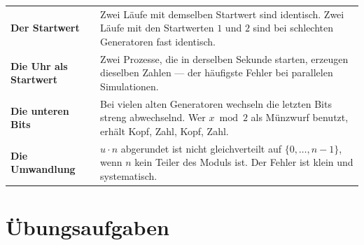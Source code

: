 \begin{warnung}
\begin{center}
{\small
\renewcommand{\arraystretch}{1.52}
\begin{tabular}{@{}P{2.8cm}P{5.8cm}@{}}
\toprule
\textbf{Der Startwert} & Zwei Läufe mit demselben Startwert sind identisch. Zwei Läufe mit den Startwerten $1$ und $2$ sind bei schlechten Generatoren fast identisch.\\
\textbf{Die Uhr als Startwert} & Zwei Prozesse, die in derselben Sekunde starten, erzeugen dieselben Zahlen --- der häufigste Fehler bei parallelen Simulationen.\\
\textbf{Die unteren Bits} & Bei vielen alten Generatoren wechseln die letzten Bits streng abwechselnd. Wer $x \bmod 2$ als Münzwurf benutzt, erhält Kopf, Zahl, Kopf, Zahl.\\
\textbf{Die Umwandlung} & $u\cdot n$ abgerundet ist nicht gleichverteilt auf $\{0,\ldots,n-1\}$, wenn $n$ kein Teiler des Moduls ist. Der Fehler ist klein und systematisch.\\
\bottomrule
\end{tabular}}
\end{center}

\begin{center}
\begin{minipage}{0.88\textwidth}
\end{minipage}
\end{center}
\end{warnung}

\section{Übungsaufgaben}

